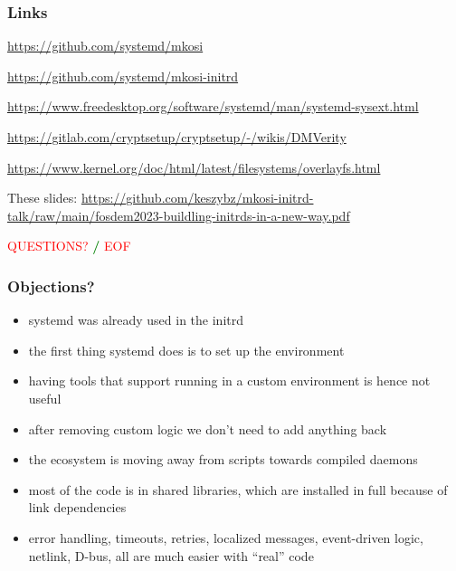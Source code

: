\documentclass[]{beamer}
\newcommand\pp{}
\begin{document}
\begin{frame}[fragile]
  \frametitle{Links}

  \url{https://github.com/systemd/mkosi}

  \url{https://github.com/systemd/mkosi-initrd}

  \url{https://www.freedesktop.org/software/systemd/man/systemd-sysext.html}

  {
    \small
    \url{https://gitlab.com/cryptsetup/cryptsetup/-/wikis/DMVerity}\\
    }

  \url{https://www.kernel.org/doc/html/latest/filesystems/overlayfs.html}

  \quad

  These slides:
  \url{https://github.com/keszybz/mkosi-initrd-talk/raw/main/fosdem2023-buildling-initrds-in-a-new-way.pdf}

  \quad
  \pp

  \hfill \textcolor{red}{QUESTIONS?} \textcolor{green}{\bf /} \textcolor{red}{EOF} \hfill{}

\end{frame}


\begin{frame}
  \frametitle{Objections?}


  \begin{itemize}
    \pp
    \item
      systemd was already used in the initrd
    \pp
    \item
      the first thing systemd does is to set up the environment
    \pp
    \item
      having tools that support running in a custom environment is hence not useful
    \pp
    \item
      after removing custom logic we don't need to add anything back
    \pp
    \item
      the ecosystem is moving away from scripts towards compiled daemons
    \pp
    \item
      most of the code is in shared libraries, which are installed in full because of link dependencies
    \pp
    \item
      error handling, timeouts, retries, localized messages, event-driven logic, netlink,
      D-bus, all are much easier with ``real'' code
  \end{itemize}
\end{frame}
\end{document}
